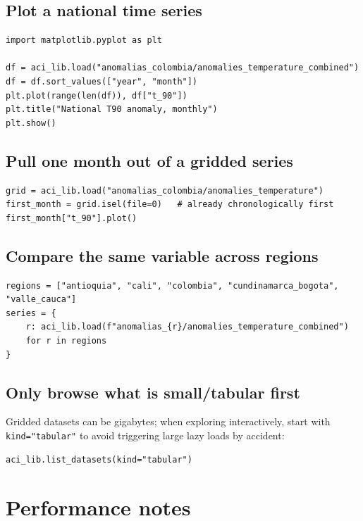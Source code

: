 \documentclass[11pt]{article}
\begin{document}
\subsection{Plot a national time series}

\begin{lstlisting}
import matplotlib.pyplot as plt

df = aci_lib.load("anomalias_colombia/anomalies_temperature_combined")
df = df.sort_values(["year", "month"])
plt.plot(range(len(df)), df["t_90"])
plt.title("National T90 anomaly, monthly")
plt.show()
\end{lstlisting}

\subsection{Pull one month out of a gridded series}

\begin{lstlisting}
grid = aci_lib.load("anomalias_colombia/anomalies_temperature")
first_month = grid.isel(file=0)   # already chronologically first
first_month["t_90"].plot()
\end{lstlisting}

\subsection{Compare the same variable across regions}

\begin{lstlisting}
regions = ["antioquia", "cali", "colombia", "cundinamarca_bogota", "valle_cauca"]
series = {
    r: aci_lib.load(f"anomalias_{r}/anomalies_temperature_combined")
    for r in regions
}
\end{lstlisting}

\subsection{Only browse what is small/tabular first}

Gridded datasets can be gigabytes; when exploring interactively, start
with \texttt{kind="tabular"} to avoid triggering large lazy loads by
accident:

\begin{lstlisting}
aci_lib.list_datasets(kind="tabular")
\end{lstlisting}

\section{Performance notes}
\label{sec:perf}
\end{document}
